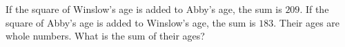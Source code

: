 If the square of Winslow's age is added to Abby's age, the sum is $209$. If the square of Abby's age is added to Winslow's age, the sum is $183$. Their ages are whole numbers. What is the sum of their ages?
